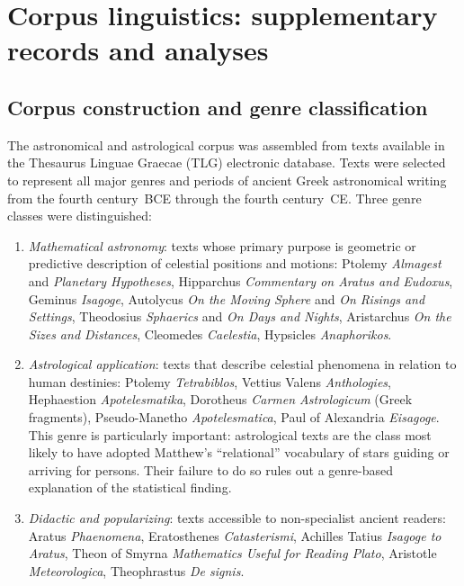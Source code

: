 \documentclass[11pt,a4paper]{article}
\begin{document}
\section*{Corpus linguistics: supplementary records and analyses}

\subsection{Corpus construction and genre classification}\label{subsec:corpusconstr}

The astronomical and astrological corpus was assembled from texts available
in the Thesaurus Linguae Graecae (TLG) electronic database\cite{tlg}. Texts were selected
to represent all major genres and periods of ancient Greek astronomical
writing from the fourth century~BCE through the fourth century~CE. Three
genre classes were distinguished:

\begin{enumerate}
  \item \textit{Mathematical astronomy}: texts whose primary purpose is
    geometric or predictive description of celestial positions and
    motions: Ptolemy \textit{Almagest} and \textit{Planetary Hypotheses},
    Hipparchus \textit{Commentary on Aratus and Eudoxus}, Geminus
    \textit{Isagoge}, Autolycus \textit{On the Moving Sphere} and \textit{On
    Risings and Settings}, Theodosius \textit{Sphaerics} and \textit{On Days
    and Nights}, Aristarchus \textit{On the Sizes and Distances}, Cleomedes
    \textit{Caelestia}, Hypsicles \textit{Anaphorikos}.

  \item \textit{Astrological application}: texts that describe celestial
    phenomena in relation to human destinies: Ptolemy \textit{Tetrabiblos},
    Vettius Valens \textit{Anthologies}, Hephaestion \textit{Apotelesmatika},
    Dorotheus \textit{Carmen Astrologicum} (Greek fragments),
    Pseudo-Manetho \textit{Apotelesmatica}, Paul of Alexandria
    \textit{Eisagoge}. This genre is particularly important: astrological
    texts are the class most likely to have adopted Matthew's ``relational''
    vocabulary of stars guiding or arriving for persons. Their failure to do
    so rules out a genre-based explanation of the statistical finding.

  \item \textit{Didactic and popularizing}: texts accessible to
    non-specialist ancient readers: Aratus \textit{Phaenomena}, Eratosthenes
    \textit{Catasterismi}, Achilles Tatius \textit{Isagoge to Aratus},
    Theon of Smyrna \textit{Mathematics Useful for Reading Plato},
    Aristotle \textit{Meteorologica}, Theophrastus \textit{De signis}.
\end{enumerate}
\end{document}
